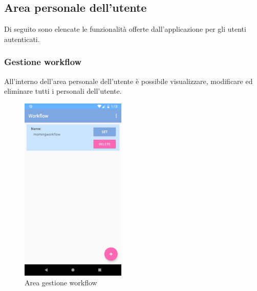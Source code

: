 \subsection{Area personale dell'utente}
\label{sec:sec_area_personale_utente}
Di seguito sono elencate le funzionalità offerte dall'applicazione per gli utenti autenticati.
\subsubsection{Gestione workflow}
All'interno dell'area personale dell'utente è possibile visualizzare, modificare ed eliminare tutti i  personali dell'utente.
\begin{figure}[H]
	\centering
	\includegraphics[width=5cm]{../includes/pics/area_workflow_utente.png}
	\caption{\label{fig:area_workflow_utente}Area gestione workflow}
\end{figure}
